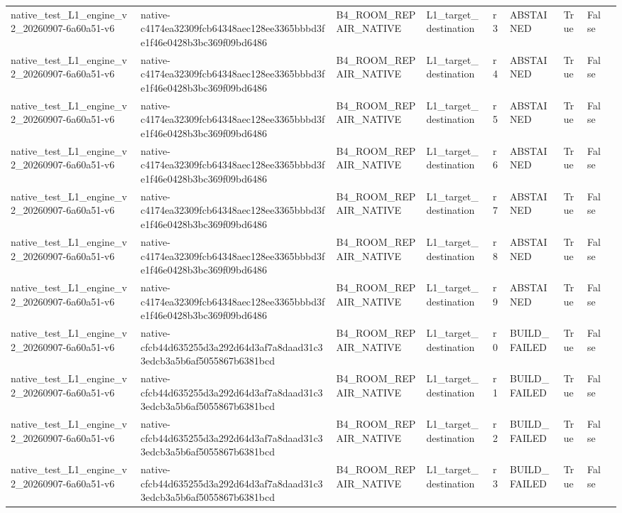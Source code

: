 \begin{tabular}{lllllllll}
native\_test\_L1\_engine\_v2\_20260907-6a60a51-v6 & native-c4174ea32309fcb64348aec128ee3365bbbd3fe1f46e0428b3bc369f09bd6486 & B4\_ROOM\_REPAIR\_NATIVE & L1\_target\_destination & r3 & ABSTAINED & True & False &  \\
native\_test\_L1\_engine\_v2\_20260907-6a60a51-v6 & native-c4174ea32309fcb64348aec128ee3365bbbd3fe1f46e0428b3bc369f09bd6486 & B4\_ROOM\_REPAIR\_NATIVE & L1\_target\_destination & r4 & ABSTAINED & True & False &  \\
native\_test\_L1\_engine\_v2\_20260907-6a60a51-v6 & native-c4174ea32309fcb64348aec128ee3365bbbd3fe1f46e0428b3bc369f09bd6486 & B4\_ROOM\_REPAIR\_NATIVE & L1\_target\_destination & r5 & ABSTAINED & True & False &  \\
native\_test\_L1\_engine\_v2\_20260907-6a60a51-v6 & native-c4174ea32309fcb64348aec128ee3365bbbd3fe1f46e0428b3bc369f09bd6486 & B4\_ROOM\_REPAIR\_NATIVE & L1\_target\_destination & r6 & ABSTAINED & True & False &  \\
native\_test\_L1\_engine\_v2\_20260907-6a60a51-v6 & native-c4174ea32309fcb64348aec128ee3365bbbd3fe1f46e0428b3bc369f09bd6486 & B4\_ROOM\_REPAIR\_NATIVE & L1\_target\_destination & r7 & ABSTAINED & True & False &  \\
native\_test\_L1\_engine\_v2\_20260907-6a60a51-v6 & native-c4174ea32309fcb64348aec128ee3365bbbd3fe1f46e0428b3bc369f09bd6486 & B4\_ROOM\_REPAIR\_NATIVE & L1\_target\_destination & r8 & ABSTAINED & True & False &  \\
native\_test\_L1\_engine\_v2\_20260907-6a60a51-v6 & native-c4174ea32309fcb64348aec128ee3365bbbd3fe1f46e0428b3bc369f09bd6486 & B4\_ROOM\_REPAIR\_NATIVE & L1\_target\_destination & r9 & ABSTAINED & True & False &  \\
native\_test\_L1\_engine\_v2\_20260907-6a60a51-v6 & native-cfcb44d635255d3a292d64d3af7a8daad31c33edcb3a5b6af5055867b6381bcd & B4\_ROOM\_REPAIR\_NATIVE & L1\_target\_destination & r0 & BUILD\_FAILED & True & False &  \\
native\_test\_L1\_engine\_v2\_20260907-6a60a51-v6 & native-cfcb44d635255d3a292d64d3af7a8daad31c33edcb3a5b6af5055867b6381bcd & B4\_ROOM\_REPAIR\_NATIVE & L1\_target\_destination & r1 & BUILD\_FAILED & True & False &  \\
native\_test\_L1\_engine\_v2\_20260907-6a60a51-v6 & native-cfcb44d635255d3a292d64d3af7a8daad31c33edcb3a5b6af5055867b6381bcd & B4\_ROOM\_REPAIR\_NATIVE & L1\_target\_destination & r2 & BUILD\_FAILED & True & False &  \\
native\_test\_L1\_engine\_v2\_20260907-6a60a51-v6 & native-cfcb44d635255d3a292d64d3af7a8daad31c33edcb3a5b6af5055867b6381bcd & B4\_ROOM\_REPAIR\_NATIVE & L1\_target\_destination & r3 & BUILD\_FAILED & True & False &  \\

\end{tabular}
